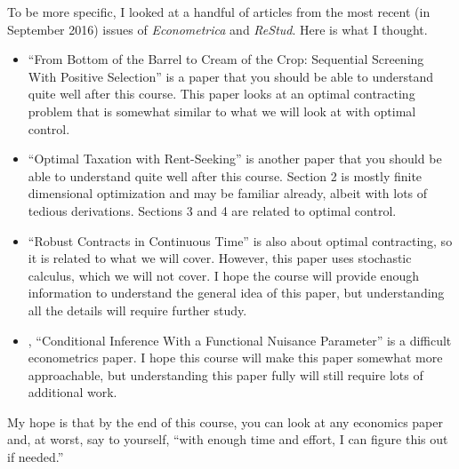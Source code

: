 \documentclass[10pt]{article}
\renewcommand{\cite}{\citet}
\begin{document}
To be more specific, I looked at a handful of articles from the most
recent (in September 2016) issues of {\slshape{Econometrica}} and
{\slshape{ReStud}}. Here is what I thought.
\begin{itemize}
\item \cite{tirole2016} ``From Bottom of the Barrel to Cream of the
  Crop: Sequential Screening With Positive Selection'' is a paper that
  you should be able to understand quite well after this course. This
  paper looks at an optimal contracting problem that is somewhat
  similar to what we will look at with optimal control. 
\item \cite{rs2016} ``Optimal Taxation with Rent-Seeking'' is another
  paper that you should be able to understand quite well after this
  course. Section 2 is mostly finite dimensional optimization and may
  be familiar already, albeit with lots of tedious
  derivations. Sections 3 and 4 are related to optimal control.
\item \cite{mr2016} ``Robust Contracts in Continuous Time'' is also
  about optimal contracting, so it is related to what we will
  cover. However, this paper uses stochastic calculus, which we will
  not cover. I hope the course will provide enough information to
  understand the general idea of this paper, but understanding all the
  details will require further study. 
\item \cite{am2016}, ``Conditional Inference With a Functional
  Nuisance Parameter'' is a difficult econometrics paper. I hope this
  course will make this paper somewhat more approachable, but
  understanding this paper fully will still require lots of additional
  work.
\end{itemize}
My hope is that by the end of this course, you can look at any
economics paper and, at worst, say to yourself, ``with enough time and
effort, I can figure this out if needed.'' 


\clearpage


\end{document}
